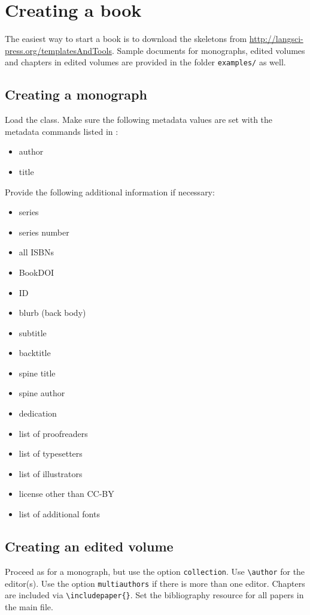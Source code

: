 \documentclass[%
output=guidelines,guidelines]{../langscibook}
\begin{document}
\chapter{Creating a book}
The easiest way to start a book is to download the skeletons from \url{http://langsci-press.org/templatesAndTools}. Sample documents for monographs, edited volumes and chapters in edited volumes are provided in the folder \texttt{examples/} as well.

\section{Creating a monograph}
Load the class. Make sure the following metadata values are set with the metadata commands listed in :

\begin{itemize}
 \item author
 \item title
\end{itemize}

Provide the following additional information if necessary:
\begin{itemize}
 \item series
 \item series number
 \item all ISBNs
 \item BookDOI
 \item ID
 \item blurb (back body)
 \item subtitle
 \item backtitle
 \item spine title
 \item spine author
 \item dedication
 \item list of proofreaders
 \item list of typesetters
 \item list of illustrators
 \item license other than CC-BY
 \item list of additional fonts
\end{itemize}


\section{Creating an edited volume}
Proceed as for a monograph, but use the option \texttt{collection}. Use \verb+\author+ for the editor(s). Use the option \texttt{multiauthors} if there is more than one editor.
Chapters are included via \verb+\includepaper{}+. Set the bibliography resource for all papers in the main file.
\end{document}
